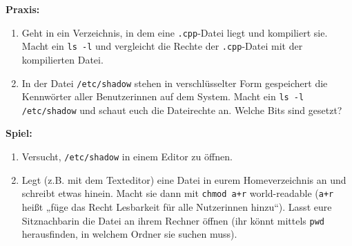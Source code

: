 \textbf{Praxis:}
\begin{enumerate}
    \item Geht in ein Verzeichnis, in dem eine \texttt{.cpp}-Datei liegt und
        kompiliert sie. Macht ein \texttt{ls -l} und vergleicht die Rechte der
        \texttt{.cpp}-Datei mit der kompilierten Datei.
    \item In der Datei \texttt{/etc/shadow} stehen in verschlüsselter Form
        gespeichert die Kennwörter aller Benutzerinnen auf dem System. Macht ein
        \texttt{ls -l /etc/shadow} und schaut euch die Dateirechte an. Welche
        Bits sind gesetzt?
\end{enumerate}

\textbf{Spiel:}
\begin{enumerate}
    \item Versucht, \texttt{/etc/shadow} in einem Editor zu öffnen.
    \item Legt (z.B. mit dem Texteditor) eine Datei in eurem Homeverzeichnis an
        und schreibt etwas hinein. Macht sie dann mit \texttt{chmod a+r}
        world-readable (\texttt{a+r} heißt „füge das Recht Lesbarkeit für alle
        Nutzerinnen hinzu“). Lasst eure Sitznachbarin die Datei an ihrem Rechner
        öffnen (ihr könnt mittels \texttt{pwd} herausfinden, in welchem Ordner
        sie suchen muss).
\end{enumerate}
